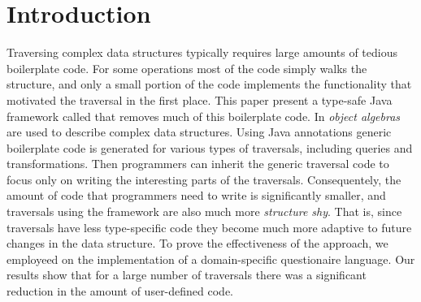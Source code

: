 \section{Introduction}

Traversing complex data structures typically requires large amounts of
tedious boilerplate code. For some operations most of the code simply
walks the structure, and only a small portion of the code implements
the functionality that motivated the traversal in the first place.
This paper present a type-safe Java framework called \name that
removes much of this boilerplate code. In \name \emph{object algebras}
are used to describe complex data structures. Using Java annotations
generic boilerplate code is generated for various types of traversals,
including queries and transformations. Then programmers can inherit
the generic traversal code to focus only on writing the interesting
parts of the traversals. Consequentely, the amount of code that
programmers need to write is significantly smaller, and traversals
using the \name framework are also much more \emph{structure
  shy}. That is, since traversals have less type-specific code they
become much more adaptive to future changes in the data structure.
To prove the effectiveness of the approach, we employeed \name 
on the implementation of a domain-specific questionaire 
language. Our results show that for a large number of traversals 
there was a significant reduction in the amount of user-defined code.


